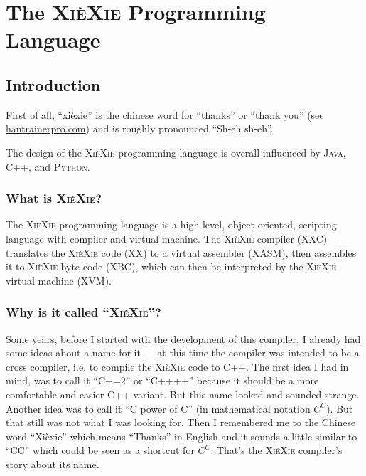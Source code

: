 \documentclass{report}
\def\xiexie{\textsc{Xi\`eXie}\xspace}
\def\xxlang{\xiexie programming language\xspace}
\def\cpp{\textsc{C++}\xspace}
\def\java{\textsc{Java}\xspace}
\def\python{\textsc{Python}\xspace}
\begin{document}
\part{The \xiexie Programming Language}



\chapter{Introduction}

First of all, ``xi\`exie'' is the chinese word for ``thanks'' or ``thank you''
(see \href{http://dictionary.hantrainerpro.com/chinese-english/translation-xiexie_thankyou.htm}{hantrainerpro.com})
and is roughly pronounced ``Sh-eh sh-eh''.

The design of the \xxlang is overall influenced by \java, \cpp, and \python.



\section{What is \xiexie?}

The \xiexie programming language is a high-level, object-oriented, scripting language with compiler and virtual machine.
The \xiexie compiler (XXC) translates the \xiexie code (XX) to a virtual assembler (XASM), then assembles it to
\xiexie byte code (XBC), which can then be interpreted by the \xiexie virtual machine (XVM).



\section{Why is it called ``\xiexie''?}

Some years, before I started with the development of this compiler, I already had some ideas about a name for it
--- at this time the compiler was intended to be a cross compiler, i.e. to compile the \xiexie code to \cpp.
The first idea I had in mind, was to call it ``C+=2'' or ``C++++'' because it should be a more comfortable and easier
\cpp variant. But this name looked and sounded strange. Another idea was to call it ``C power of C''
(in mathematical notation $C^C$). But that still was not what I was looking for.
Then I remembered me to the Chinese word ``Xi\`exie'' which means ``Thanks'' in English and it sounds a little
similar to ``CC'' which could be seen as a shortcut for $C^C$. That's the \xiexie compiler's story about its name.
\end{document}
